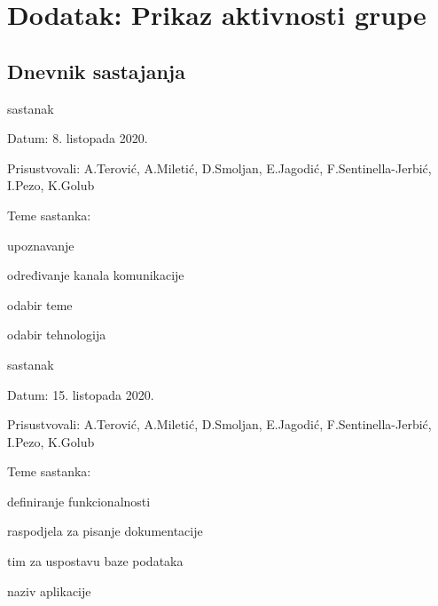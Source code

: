 \chapter*{Dodatak: Prikaz aktivnosti grupe}

\section*{Dnevnik sastajanja}

\begin{packed_enum}
	
	\item  sastanak
	\item[] \begin{packed_item}
		\item Datum: 8. listopada 2020.
		\item Prisustvovali: A.Terović, A.Miletić, D.Smoljan, E.Jagodić, F.Sentinella-Jerbić, I.Pezo, K.Golub
		\item Teme sastanka:
		\begin{packed_item}
			\item upoznavanje
			\item određivanje kanala komunikacije
			\item odabir teme
			\item odabir tehnologija
		\end{packed_item}
	\end{packed_item}
	
	\item  sastanak
	\item[] \begin{packed_item}
		\item Datum: 15. listopada 2020.
		\item Prisustvovali: A.Terović, A.Miletić, D.Smoljan, E.Jagodić, F.Sentinella-Jerbić, I.Pezo, K.Golub
		\item Teme sastanka:
		\begin{packed_item}
			\item definiranje funkcionalnosti
			\item raspodjela za pisanje dokumentacije
			\item tim za uspostavu baze podataka
			\item naziv aplikacije
		\end{packed_item}
	\end{packed_item}
	

\end{packed_enum}
